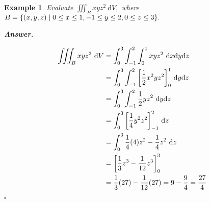 \documentclass[12pt,a4paper]{article}
\newtheorem{eg}{Example}[subsection]
\newenvironment*{ans}{\par\indent\textbf{\textit{Answer. }}\par}{\par\hfill{$\square$}\par}
\def\dsst{\displaystyle}
\def\d{{\mathrm{d}}}
\def\dx{\d x}
\def\iiintB{\dsst\iiint_B}
\begin{document}
\begin{eg}
	Evaluate $\iiintB xyz^2\ \d V,$	where $B=\qty{(x,y,z)\mid 0\leq x\leq1, -1\leq y\leq2, 0\leq z\leq 3}.$
	\begin{ans}
		\[\begin{aligned}\iiintB xyz^2\ \d V&=\int_0^3\int_{-1}^2\int_0^1xyz^2\ \dx\d y\d z\\&=\int_0^3\int_{-1}^2\qty[\dfrac{1}{2}x^2yz^2]_0^1\ \d y\d z\\&=\int_0^3\int_{-1}^2\dfrac{1}{2}yz^2\ \d y\d z\\&=\int_0^3\qty[\dfrac{1}{4}y^2z^2]_{-1}^2\ \d z\\&=\int_0^3\dfrac{1}{4}(4)z^2-\dfrac{1}{4}z^2\ \d z\\&=\qty[\dfrac{1}{3}z^3-\dfrac{1}{12}z^3]_0^3\\&=\dfrac{1}{3}(27)-\dfrac{1}{12}(27)=9-\dfrac{9}{4}=\dfrac{27}{4}\end{aligned}\]
	\end{ans}
\end{eg}
\end{document}
